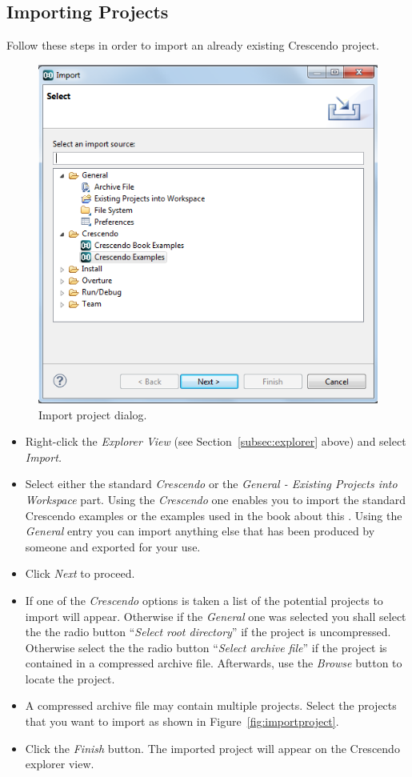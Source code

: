 \documentclass{crescendorepchap}
\begin{document}
\subsection{Importing Projects}

Follow these steps in order to import an already existing Crescendo
project.

\begin{figure}[htbp]
\centering
\includegraphics[width=.6\textwidth]{images/DestecsImportDialog.png}
\caption{Import project dialog.\label{fig:ImportDialogue}}
\end{figure}

\begin{itemize}
\item
  Right-click the \emph{Explorer View} (see Section~\ref{subsec:explorer} above)  and
  select \emph{Import.}
\item
  Select either the standard \emph{Crescendo} or the \emph{General - Existing Projects into
  Workspace} part. Using the \emph{Crescendo} one enables you to import the standard Crescendo examples or the examples used in the book about this \cite{Fitzgerald&13a}. Using the \emph{General} entry you can import anything else that has been produced by someone and exported for your use.
\item
  Click \emph{Next} to proceed.
\item
  If one of the \emph{Crescendo} options is taken a list of the potential projects to import will appear. Otherwise if the  \emph{General} one was selected you shall select the the radio button ``\emph{Select root directory}'' if the project
  is uncompressed. Otherwise select the the radio button ``\emph{Select archive
  file}'' if the project is contained in a compressed archive file. Afterwards, use
  the \emph{Browse} button to locate the project.
\item
  A compressed archive file may contain multiple projects. Select
  the projects that you want to import as shown in Figure~\ref{fig:importproject}.
\item
  Click the \emph{Finish} button. The imported project will appear on
  the Crescendo explorer view.
\end{itemize}
\end{document}
